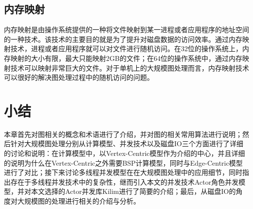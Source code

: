 \subsection{内存映射}


内存映射是由操作系统提供的一种将文件映射到某一进程或者应用程序的地址空间的一种技术。该技术的主要目的就是为了提升对磁盘数据的访问效率。通过内存映射技术，进程或者应用程序就可以对文件进行随机访问。在32位的操作系统上，内存映射的大小有限，最大只能映射2GB的文件；在64位的操作系统中，通过内存映射技术可以映射非常巨大的文件。对于单机上的大规模图处理而言，内存映射技术可以很好的解决图处理过程中的随机访问的问题。


\section{小结}

本章首先对图相关的概念和术语进行了介绍，并对图的相关常用算法进行说明；然后针对大规模图处理分别从计算模型、并发技术以及磁盘IO三个方面进行了详细的讨论和说明：在计算模型中，以Vertex-Centric模型作为介绍的中心，并且详细的说明为什么在Vertex-Centric之外需要BSP计算模型，同时与Edge-Centric模型进行了对比；接下来讨论多线程并发模型在在大规模图处理中的应用细节，同时指出存在于多线程并发技术中的复杂性，继而引入本文的并发技术Actor角色并发模型，并对本文选择的Actor并发库Kilim进行了简要的介绍；最后，从磁盘IO的角度对大规模图的处理进行相关的介绍与分析。